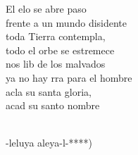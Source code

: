 \documentclass[12pt]{article}
\begin{document}
\begin{multicols*}{2}
\begin{cancion}
\jump
	El elo se abre paso \\
frente a un mundo disidente\\
	toda  Tierra contempla, \\
todo el orbe se estremece\\
	nos lib de los malvados  \\
	ya no hay rra para el hombre\\
	acla su santa gloria,\\
	 acad su santo nombre\\\jump\\
	\begin{chorus}%
	-leluya aleya-l-*)\\
	\end{chorus}%
	\jump\\
\end{cancion}%


\end{multicols*}
\end{document}
